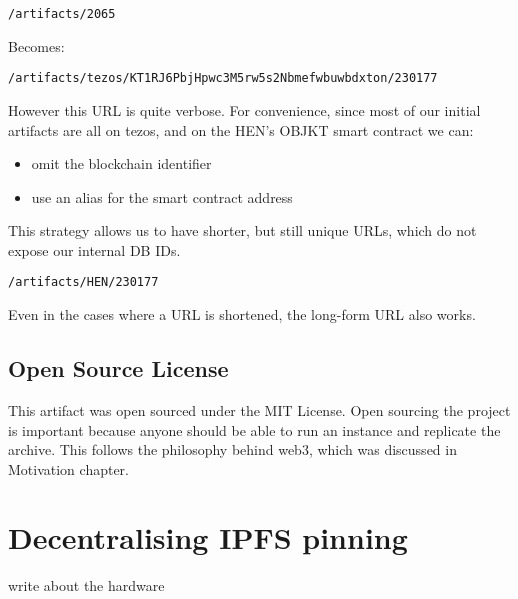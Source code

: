 \texttt{/artifacts/2065}

Becomes:

\texttt{/artifacts/tezos/KT1RJ6PbjHpwc3M5rw5s2Nbmefwbuwbdxton/230177}


However this URL is quite verbose. For convenience, since most of our initial artifacts are all on tezos, and on the HEN's OBJKT smart contract we can:

\begin{itemize}
    \item omit the blockchain identifier
    \item use an alias for the smart contract address
\end{itemize}

This strategy allows us to have shorter, but still unique URLs, which do not expose our internal DB IDs.

\texttt{/artifacts/HEN/230177}

Even in the cases where a URL is shortened, the long-form URL also works.


\subsection{Open Source License}

This artifact was open sourced under the MIT License.
Open sourcing the project is important because anyone should be able to run an instance and replicate the archive. This follows the philosophy behind web3, which was discussed in Motivation chapter.





\section{Decentralising IPFS pinning}


\todo write about the hardware






